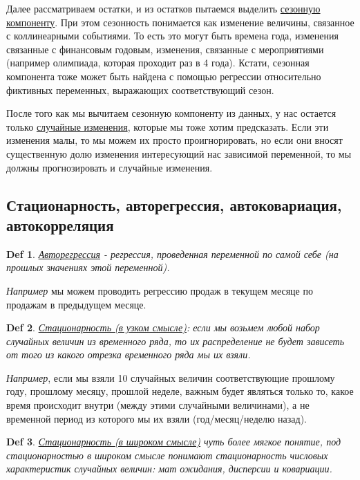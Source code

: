 \documentclass{article}
\newtheorem*{definition}{Def}
\begin{document}
Далее рассматриваем остатки, и из остатков пытаемся выделить \underline{сезонную компоненту}. При этом сезонность понимается как изменение величины, связанное с коллинеарными событиями. То есть это могут быть времена года, изменения связанные с финансовым годовым, изменения, связанные с мероприятиями (например олимпиада, которая проходит раз в 4 года). Кстати, сезонная компонента тоже может быть найдена с помощью регрессии относительно фиктивных переменных, выражающих соответствующий сезон.

После того как мы вычитаем сезонную компоненту из данных, у нас остается только \underline{случайные изменения}, которые мы тоже хотим предсказать. Если эти изменения малы, то мы можем их просто проигнорировать, но если они вносят существенную долю изменения интересующий нас зависимой переменной, то мы должны прогнозировать и случайные изменения.

\subsection{Стационарность, авторегрессия, автоковариация,  автокорреляция}
\begin{definition} \label{d2} 
\underline{Авторегрессия} - регрессия, проведенная переменной по самой себе (на прошлых значениях этой переменной). 
\end{definition}

\textit{Например} мы можем проводить регрессию продаж в текущем месяце по продажам в предыдущем месяце. 

\begin{definition} \label{d3} 
\underline{Стационарность (в узком смысле)}: если мы возьмем любой набор случайных величин из временного ряда, то их распределение не будет зависеть от того из какого отрезка временного ряда мы их взяли.
\end{definition}

\textit{ Например}, если мы взяли 10 случайных величин соответствующие прошлому году, прошлому месяцу, прошлой неделе, важным будет являться только то, какое время происходит внутри (между этими случайными величинами), а не временной период из которого мы их взяли (год/месяц/неделю назад). 

\begin{definition} \label{d4} 
\underline{Стационарность (в широком смысле)} чуть более мягкое понятие, под стационарностью в широком смысле понимают стационарность числовых характеристик случайных величин: мат ожидания, дисперсии и ковариации.
\end{definition}
\end{document}
